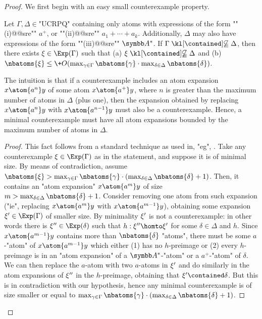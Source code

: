 \begin{proof}
	We first begin with an easy small counterexample property.
	\begin{claim}
		\AP\label{cl:small-counterexample-SRE}
		Let $\Gamma, \Delta \in \text{"UCRPQ"}$ containing only atoms with expressions of the form \AP""(i)@@sre"" $a^+$, or ""(ii)@@sre"" $a_1 + \dotsb + a_k$. Additionally, $\Delta$ may also have expressions of the form ""(iii)@@sre"" $\A^*$. If $\Gamma \notcontained \Delta$, then there exists $\anexpansion \in \Exp(\Gamma)$ such that (a) $\anexpansion \notcontained \Delta$ and (b) $\nbatoms{\anexpansion} \leq \+O(\max_{\gamma \in \Gamma}\nbatoms{\gamma} \cdot \max_{\delta \in \Delta}\nbatoms{\delta})$.
	\end{claim}

	The intuition is that if a counterexample includes an atom expansion $x \atom{a^n} y$ of some atom $x \atom{a^+} y$, where $n$ is greater than the maximum number of atoms in $\Delta$ (plus one), then the expansion obtained by replacing $x \atom{a^n} y$ with $x \atom{a^{n-1}} y$ must also be a counterexample. Hence, a minimal counterexample must have all atom expansions bounded by the maximum number of atoms in $\Delta$.

	\begin{proof}
		This fact follows from a standard technique as used in, "eg", \cite{FigueiraEtal2020Containment}.
		Take any counterexample $\anexpansion \in \Exp(\Gamma)$ as in the statement, and suppose it is of minimal size. By means of contradiction, assume $\nbatoms{\anexpansion} > \max_{\gamma \in \Gamma}\nbatoms{\gamma} \cdot (\max_{\delta \in \Delta}\nbatoms{\delta}+1)$. 
		Then, it contains an "atom expansion" $x \atom{a^m} y$ of size $m>\max_{\delta \in \Delta}\nbatoms{\delta}+1$. 
		Consider removing one atom from such expansion ("ie", replacing $x \atom{a^m} y$ with $x \atom{a^{m-1}} y$), obtaining some expansion $\anexpansion' \in \Exp(\Gamma)$ of smaller size. By minimality $\xi'$ is not a counterexample: in other words there is  $\anexpansion'' \in \Exp(\delta)$ such that $h:\anexpansion'' \homto \anexpansion'$ for some $\delta \in \Delta$ and $h$. Since $x \atom{a^{m-1}} y$ contains more than $\nbatoms{\delta}$ "atoms", there must be some $a$-"atom" of $x \atom{a^{m-1}} y$ which either (1) has no $h$-preimage or (2) every $h$-preimage is in an "atom expansion" of a $\A^*$-"atom" or a $a^+$-"atom" of $\delta$. We can then replace the $a$-atom with two $a$-atoms in $\xi'$ and do similarly in the atom expansions of $\xi''$ in the $h$-preimage, obtaining that $\anexpansion' \contained \delta$. But this is in contradiction with our hypothesis, hence any minimal counterexample is of size smaller or equal to $\max_{\gamma \in \Gamma}\nbatoms{\gamma} \cdot (\max_{\delta \in \Delta}\nbatoms{\delta}+1)$.
	\end{proof}
	

\end{proof}
